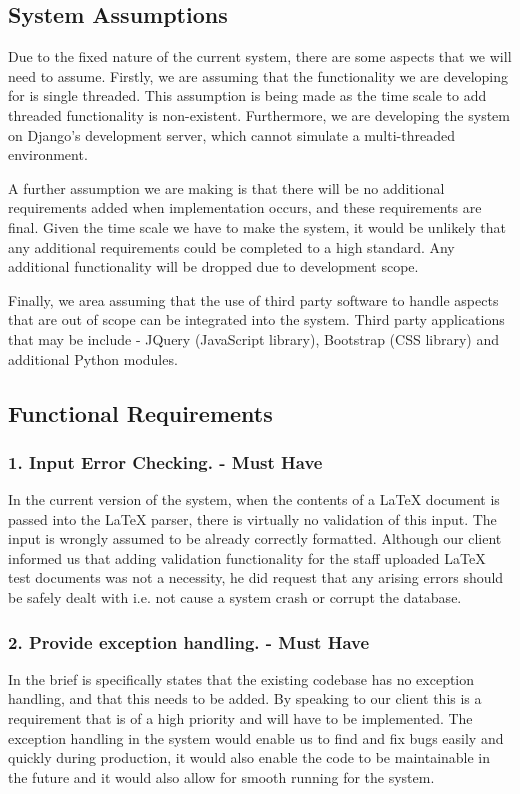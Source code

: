 	\subsection*{System Assumptions}
	Due to the fixed nature of the current system, there are some aspects that we will need to assume. Firstly, we are assuming that the functionality we are developing for is single threaded. This assumption is being made as the time scale to add threaded functionality is non-existent. Furthermore, we are developing the system on Django's development server, which cannot simulate a multi-threaded environment. 
	
	A further assumption we are making is that there will be no additional requirements added when implementation occurs, and these requirements are final. Given the time scale we have to make the system, it would be unlikely that any additional requirements could be completed to a high standard. Any additional functionality will be dropped due to development scope. 
	
	Finally, we area assuming that the use of third party software to handle aspects that are out of scope can be integrated into the system. Third party applications that may be include - JQuery (JavaScript library), Bootstrap (CSS library) and additional Python modules.
	\subsection*{Functional Requirements}
	\subsubsection*{1. Input Error Checking. - Must Have}
	In the current version of the system, when the contents of a LaTeX document is passed into the LaTeX parser, there is virtually no validation of this input. The input is wrongly assumed to be already correctly formatted. Although our client informed us that adding validation functionality for the staff uploaded LaTeX test documents was not a necessity, he did request that any arising errors should be safely dealt with i.e. not cause a system crash or corrupt the database.
	\subsubsection*{2. Provide exception handling. - Must Have}
	In the brief is specifically states that the existing codebase has no exception handling, and that this needs to be added. By speaking to our client this is a requirement that is of a high priority and will have to be implemented.
The exception handling in the system would enable us to find and fix bugs easily and quickly during production, it would also enable the code to be maintainable in the future and it would also allow for smooth running for the system.

